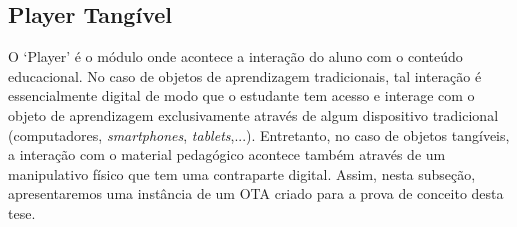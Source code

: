 \subsection{Player Tangível}\label{subsec:tools_player}

O `Player' é o módulo onde acontece a interação do aluno com o conteúdo educacional. No caso de objetos de aprendizagem tradicionais, tal interação é essencialmente digital de modo que o estudante tem acesso e interage com o objeto de aprendizagem exclusivamente através de algum dispositivo tradicional (computadores, \textit{smartphones}, \textit{tablets},...). Entretanto, no caso de objetos tangíveis, a interação com o material pedagógico acontece também através de um manipulativo físico que tem uma contraparte digital. Assim, nesta subseção, apresentaremos uma instância de um OTA criado para a prova de conceito desta tese.




